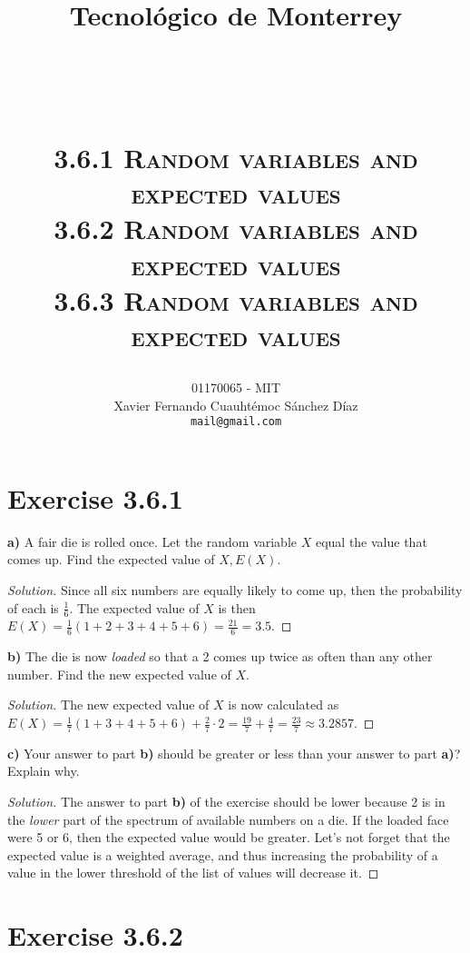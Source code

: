 \documentclass[titlepage, letterpaper, fleqn]{article}
\title{
\vspace{1in}
\textbf{Tecnológico de Monterrey} \\
\vspace{0.5in}
\textmd{\mahclass} \\
\large{\textit{\mahteacher}} \\
\vspace{0.5in}
\textsc{\mahtitle}\\
\textsc{3.6.1 Random variables and expected values}\\
\textsc{3.6.2 Random variables and expected values}\\
\textsc{3.6.3 Random variables and expected values}\\
\author{01170065  - MIT \\
Xavier Fernando Cuauhtémoc Sánchez Díaz \\
\texttt{mail@gmail.com}}
\date{\mahdate}
}
\newcommand{\spacepls}{\vspace{5mm}}
\renewcommand\qedsymbol{\(\blacksquare\)}
\newenvironment{solution}
{\renewcommand\qedsymbol{$\square$}\begin{proof}[Solution]}
{\end{proof}}
\begin{document}
\begin{titlepage}
\maketitle
\end{titlepage}

%
%

\section{Exercise 3.6.1}

{\large \textbf{a)} A fair die is rolled once.
Let the random variable \(X\) equal the value that comes up.
Find the expected value of \(X, E(X)\).}

\begin{solution}
Since all six numbers are equally likely to come up, then the probability of each is \(\frac{1}{6}\).
The expected value of \(X\) is then \(E(X) = \frac{1}{6}(1 + 2 + 3 + 4 + 5 + 6) = \frac{21}{6} = 3.5\).
\end{solution}

\spacepls

{\large \textbf{b)} The die is now \textit{loaded} so that a 2 comes up twice as often than any other number.
Find the new expected value of \(X\).}

\begin{solution}
The new expected value of \(X\) is now calculated as \(E(X) = \frac{1}{7}(1 + 3 + 4 + 5 + 6) + \frac{2}{7} \cdot 2 = \frac{19}{7} + \frac{4}{7} = \frac{23}{7} \approx 3.2857\).
\end{solution}

\spacepls

{\large \textbf{c)} Your answer to part \textbf{b)} should be greater or less than your answer to part \textbf{a)}? Explain why.}

\begin{solution}
The answer to part \textbf{b)} of the exercise should be lower because 2 is in the \textit{lower} part of the spectrum of available numbers on a die.
If the loaded face were 5 or 6, then the expected value would be greater.
Let's not forget that the expected value is a weighted average, and thus increasing the probability of a value in the lower threshold of the list of values will decrease it.
\end{solution}

\section{Exercise 3.6.2}
\end{document}
